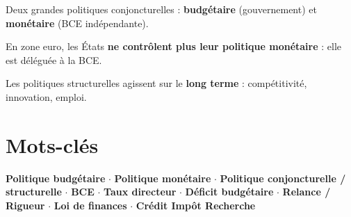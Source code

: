 \documentclass[11pt,a4paper]{article}
\begin{document}
\begin{keybox}
Deux grandes politiques conjoncturelles : \textbf{budgétaire} (gouvernement) et \textbf{monétaire} (BCE indépendante).
\end{keybox}
\vspace{3pt}
\begin{keybox}
En zone euro, les États \textbf{ne contrôlent plus leur politique monétaire} : elle est déléguée à la BCE.
\end{keybox}
\vspace{3pt}
\begin{keybox}
Les politiques structurelles agissent sur le \textbf{long terme} : compétitivité, innovation, emploi.
\end{keybox}

\section*{Mots-clés}
\textcolor{mainColor}{\textbf{Politique budgétaire}} $\cdot$
\textcolor{mainColor}{\textbf{Politique monétaire}} $\cdot$
\textcolor{mainColor}{\textbf{Politique conjoncturelle / structurelle}} $\cdot$
\textcolor{mainColor}{\textbf{BCE}} $\cdot$
\textcolor{mainColor}{\textbf{Taux directeur}} $\cdot$
\textcolor{mainColor}{\textbf{Déficit budgétaire}} $\cdot$
\textcolor{mainColor}{\textbf{Relance / Rigueur}} $\cdot$
\textcolor{mainColor}{\textbf{Loi de finances}} $\cdot$
\textcolor{mainColor}{\textbf{Crédit Impôt Recherche}}
\end{document}
